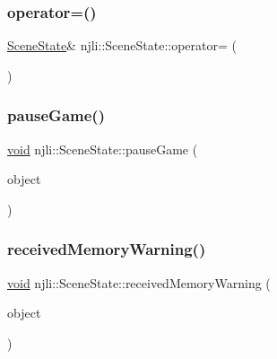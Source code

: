 \subsubsection{\texorpdfstring{operator=()}{operator=()}}
{\footnotesize\ttfamily \mbox{\hyperlink{classnjli_1_1_scene_state}{Scene\+State}}\& njli\+::\+Scene\+State\+::operator= (\begin{DoxyParamCaption}\item[{const \mbox{\hyperlink{classnjli_1_1_scene_state}{Scene\+State}} \&}]{ }\end{DoxyParamCaption})\hspace{0.3cm}{\ttfamily [protected]}}

\mbox{\label{classnjli_1_1_scene_state_a7937319d3e5d2444f873841065b463bc}} 
\subsubsection{\texorpdfstring{pause\+Game()}{pauseGame()}}
{\footnotesize\ttfamily \mbox{\hyperlink{_thread_8h_af1e856da2e658414cb2456cb6f7ebc66}{void}} njli\+::\+Scene\+State\+::pause\+Game (\begin{DoxyParamCaption}\item[{\mbox{\hyperlink{classnjli_1_1_scene}{Scene}} $\ast$}]{object }\end{DoxyParamCaption})}

\mbox{\label{classnjli_1_1_scene_state_a2284c8a48c1b17385eef0b8b150bb02b}} 
\subsubsection{\texorpdfstring{received\+Memory\+Warning()}{receivedMemoryWarning()}}
{\footnotesize\ttfamily \mbox{\hyperlink{_thread_8h_af1e856da2e658414cb2456cb6f7ebc66}{void}} njli\+::\+Scene\+State\+::received\+Memory\+Warning (\begin{DoxyParamCaption}\item[{\mbox{\hyperlink{classnjli_1_1_scene}{Scene}} $\ast$}]{object }\end{DoxyParamCaption})}

